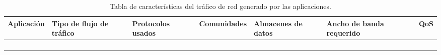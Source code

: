 \begin{table}[H]
	\begin{center}
		\begin{tabular}{|l|l|l|l|l|l|l|}
			\hline 
			Aplicación & Tipo de flujo de tráfico & Protocolos usados & Comunidades & Almacenes de datos & Ancho de banda requerido & QoS \\ 
			\hline \hline
			& & & & & & \\ \hline
			& & & & & & \\ \hline
			& & & & & & \\ \hline
			& & & & & &  \\ \hline
		\end{tabular}
		\caption{Tabla de características del tráfico de red generado por las aplicaciones.}
		\label{tabla:tabla6}
	\end{center}
\end{table}

%
%

       
